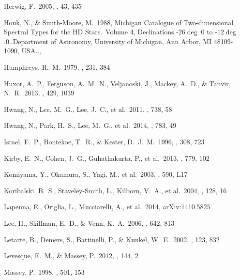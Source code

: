 \documentclass[iop]{emulateapj}
\begin{document}
\begin{thebibliography}{}
 Herwig, F.\ 2005, \araa, 43, 435

 Houk, N., \& Smith-Moore, M.\ 1988, Michigan Catalogue of Two-dimensional Spectral Types for the HD Stars.~Volume 4, Declinations -26{$\deg$}.0 to -12{$\deg$}.0..Department of Astronomy, University of Michigan, Ann Arbor, MI 48109-1090, USA..,

 Humphreys, R.~M.\ 1979,
\apj, 231, 384

 Huxor, A.~P., Ferguson,
A.~M.~N., Veljanoski, J., Mackey, A.~D.,
\& Tanvir, N.~R.\ 2013, \mnras, 429, 1039

 Hwang, N., Lee, M.~G.,
Lee, J.~C., et al.\ 2011, \apj, 738, 58

 Hwang, N., Park, H.~S.,
Lee, M.~G., et al.\ 2014, \apj, 783, 49

 Israel, F.~P., Bontekoe, T.~R., \& Kester, D.~J.~M.\ 1996, \aap, 308, 723


 Kirby, E.~N., Cohen,
J.~G., Guhathakurta, P., et al.\ 2013, \apj, 779, 102

 Komiyama, Y., Okamura,
S., Yagi, M., et al.\ 2003, \apjl, 590, L17

 Koribalski, B.~S.,
Staveley-Smith, L., Kilborn, V.~A., et al.\ 2004, \aj, 128, 16


 Lapenna, E., Origlia,
L., Mucciarelli, A., et al.\ 2014, arXiv:1410.5825

 Lee, H., Skillman, E.~D.,
\& Venn, K.~A.\ 2006, \apj, 642, 813

 Letarte, B., Demers,
S., Battinelli, P., \& Kunkel, W.~E.\ 2002, \aj, 123, 832

 Levesque, E.~M., \& Massey, P.\ 2012, \aj, 144, 2

 Massey, P.\ 1998, \apj, 501,
153


\end{thebibliography}
\end{document}
